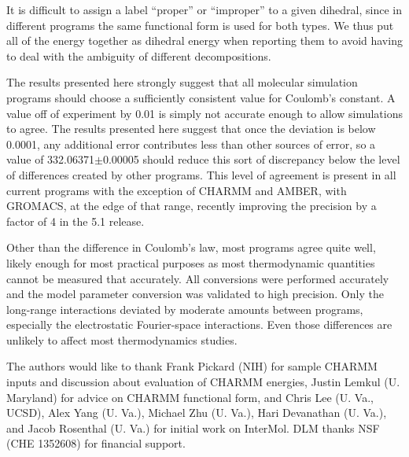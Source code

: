 It is difficult to assign a label ``proper'' or ``improper'' to a
given dihedral, since in different programs the same functional form
is used for both types. We thus put all of the energy together as
dihedral energy when reporting them to avoid having to deal with the
ambiguity of different decompositions.

The results presented here strongly suggest that all molecular
simulation programs should choose a sufficiently consistent value for
Coulomb's constant. A value off of experiment by 0.01 is simply not
accurate enough to allow simulations to agree.  The results presented
here suggest that once the deviation is below 0.0001, any additional
error contributes less than other sources of error, so a value of
332.06371$\pm$0.00005 should reduce this sort of discrepancy below the
level of differences created by other programs.  This level of
agreement is present in all current programs with the exception of
CHARMM and AMBER, with GROMACS, at the edge of that range, recently
improving the precision by a factor of 4 in the 5.1 release.

Other than the difference in Coulomb's law, most programs agree quite
well, likely enough for most practical purposes as most thermodynamic
quantities cannot be measured that accurately.  All conversions were
performed accurately and the model parameter conversion was validated
to high precision. Only the long-range interactions deviated by
moderate amounts between programs, especially the electrostatic
Fourier-space interactions.  Even those differences are unlikely to
affect most thermodynamics studies.


\begin{acknowledgements}
The authors would like to thank Frank Pickard (NIH) for sample CHARMM
inputs and discussion about evaluation of CHARMM energies, Justin
Lemkul (U. Maryland) for advice on CHARMM functional form, and Chris
Lee (U. Va., UCSD), Alex Yang (U. Va.), Michael Zhu (U. Va.), Hari Devanathan (U. Va.),
and Jacob Rosenthal (U. Va.)  for initial work on InterMol. DLM thanks NSF (CHE 1352608) for financial support.
\end{acknowledgements}



